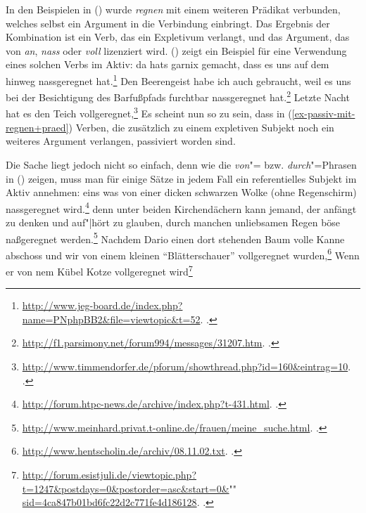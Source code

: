 \zl
In den Beispielen in () wurde \emph{regnen} mit einem weiteren Prädikat verbunden, welches
selbst ein Argument in die Verbindung einbringt. Das Ergebnis der Kombination ist ein Verb,
das ein Expletivum verlangt, und das Argument, das von \emph{an}, \emph{nass} oder \emph{voll}
lizenziert wird. () zeigt ein Beispiel für eine Verwendung eines solchen Verbs im Aktiv:
\eal
\ex da hats garnix gemacht, dass es uns auf dem hinweg nassgeregnet hat.\footnote{
 \url{http://www.jeg-board.de/index.php?name=PNphpBB2&file=viewtopic&t=52}. .%
}
\ex Den Beerengeist habe ich auch gebraucht, weil es uns bei der Besichtigung des Barfußpfads furchtbar nassgeregnet hat.\footnote{
 \url{http://f1.parsimony.net/forum994/messages/31207.htm}. .%
}
\ex Letzte Nacht hat es den Teich vollgeregnet,\footnote{%
\url{http://www.timmendorfer.de/pforum/showthread.php?id=160&eintrag=10}. .%
}
\zl
Es scheint nun so zu sein, dass in (\ref{ex-passiv-mit-regnen+praed}) Verben, die zusätzlich zu einem expletiven Subjekt noch
ein weiteres Argument verlangen, passiviert worden sind.

Die Sache liegt jedoch nicht so einfach, denn wie die \emph{von}"= bzw. \emph{durch}"=Phrasen in () zeigen,
muss man für einige Sätze in jedem Fall ein referentielles Subjekt im Aktiv annehmen:
\eal
\label{bsp-regnen+resultativ-aktiv}
\ex eins was von einer dicken schwarzen Wolke (ohne Regenschirm) nassgeregnet wird.\footnote{
  \url{http://forum.htpc-news.de/archive/index.php?t-431.html}. .
}
\ex denn unter beiden Kirchendächern kann jemand, der anfängt zu denken und auf"|hört
zu glauben, durch manchen unliebsamen Regen böse naßgeregnet werden.\footnote{
  \url{http://www.meinhard.privat.t-online.de/frauen/meine_suche.html}. .
}
\ex Nachdem Dario einen dort stehenden Baum volle Kanne abschoss und wir von einem kleinen
"`Blätterschauer"' vollgeregnet wurden,\footnote{
\url{http://www.hentscholin.de/archiv/08.11.02.txt}. .
}
\ex Wenn er von nem Kübel Kotze vollgeregnet wird\footnote{%
\href{http://forum.esistjuli.de/viewtopic.php?t=1247&postdays=0&postorder=asc&start=0&sid=4ca847b01bd6fc22d2c771fe4d186128}{http://forum.esistjuli.de/viewtopic.php?t=1247\&postdays=0\&postorder=asc\&start=0\&}""%
\href{http://forum.esistjuli.de/viewtopic.php?t=1247&postdays=0&postorder=asc&start=0&sid=4ca847b01bd6fc22d2c771fe4d186128}{sid=4ca847b01bd6fc22d2c771fe4d186128}. .%
}
\zl

